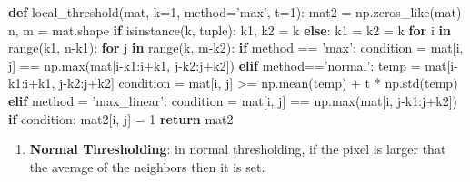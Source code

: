 \documentclass[11pt]{article}
\providecommand{\tightlist}{%
      \setlength{\itemsep}{0pt}\setlength{\parskip}{0pt}}
\newenvironment{Shaded}{}{}
\newcommand{\KeywordTok}[1]{\textcolor[rgb]{0.00,0.44,0.13}{\textbf{{#1}}}}
\newcommand{\DecValTok}[1]{\textcolor[rgb]{0.25,0.63,0.44}{{#1}}}
\newcommand{\StringTok}[1]{\textcolor[rgb]{0.25,0.44,0.63}{{#1}}}
\newcommand{\NormalTok}[1]{{#1}}
\newcommand{\ControlFlowTok}[1]{\textcolor[rgb]{0.00,0.44,0.13}{\textbf{{#1}}}}
\newcommand{\OperatorTok}[1]{\textcolor[rgb]{0.40,0.40,0.40}{{#1}}}
\newcommand{\BuiltInTok}[1]{{#1}}
\begin{document}
\begin{Shaded}
\begin{Highlighting}[]
\KeywordTok{def}\NormalTok{ local_threshold(mat, k}\OperatorTok{=}\DecValTok{1}\NormalTok{, method}\OperatorTok{=}\StringTok{'max'}\NormalTok{, t}\OperatorTok{=}\DecValTok{1}\NormalTok{):}
\NormalTok{    mat2 }\OperatorTok{=}\NormalTok{ np.zeros_like(mat)}
\NormalTok{    n, m }\OperatorTok{=}\NormalTok{ mat.shape}
    \ControlFlowTok{if} \BuiltInTok{isinstance}\NormalTok{(k, }\BuiltInTok{tuple}\NormalTok{):}
\NormalTok{        k1, k2 }\OperatorTok{=}\NormalTok{ k}
    \ControlFlowTok{else}\NormalTok{:}
\NormalTok{        k1 }\OperatorTok{=}\NormalTok{ k2 }\OperatorTok{=}\NormalTok{ k}
    \ControlFlowTok{for}\NormalTok{ i }\KeywordTok{in} \BuiltInTok{range}\NormalTok{(k1, n}\OperatorTok{-}\NormalTok{k1):}
        \ControlFlowTok{for}\NormalTok{ j }\KeywordTok{in} \BuiltInTok{range}\NormalTok{(k, m}\OperatorTok{-}\NormalTok{k2):}
            \ControlFlowTok{if}\NormalTok{ method }\OperatorTok{==} \StringTok{'max'}\NormalTok{:}
\NormalTok{                condition }\OperatorTok{=}\NormalTok{ mat[i, j] }\OperatorTok{==}\NormalTok{ np.}\BuiltInTok{max}\NormalTok{(mat[i}\OperatorTok{-}\NormalTok{k1:i}\OperatorTok{+}\NormalTok{k1, j}\OperatorTok{-}\NormalTok{k2:j}\OperatorTok{+}\NormalTok{k2])}
            \ControlFlowTok{elif}\NormalTok{ method}\OperatorTok{==}\StringTok{'normal'}\NormalTok{:}
\NormalTok{                temp }\OperatorTok{=}\NormalTok{ mat[i}\OperatorTok{-}\NormalTok{k1:i}\OperatorTok{+}\NormalTok{k1, j}\OperatorTok{-}\NormalTok{k2:j}\OperatorTok{+}\NormalTok{k2]}
\NormalTok{                condition }\OperatorTok{=}\NormalTok{ mat[i, j] }\OperatorTok{>=}\NormalTok{ np.mean(temp) }\OperatorTok{+}\NormalTok{ t }\OperatorTok{*}\NormalTok{ np.std(temp)}
            \ControlFlowTok{elif}\NormalTok{ method }\OperatorTok{=} \StringTok{'max_linear'}\NormalTok{:}
\NormalTok{                condition }\OperatorTok{=}\NormalTok{ mat[i, j] }\OperatorTok{==}\NormalTok{ np.}\BuiltInTok{max}\NormalTok{(mat[i, j}\OperatorTok{-}\NormalTok{k1:j}\OperatorTok{+}\NormalTok{k2])}
            \ControlFlowTok{if}\NormalTok{ condition:}
\NormalTok{                mat2[i, j] }\OperatorTok{=} \DecValTok{1}
    \ControlFlowTok{return}\NormalTok{ mat2}
\end{Highlighting}
\end{Shaded}

\begin{enumerate}
\def\labelenumi{\arabic{enumi}.}
\setcounter{enumi}{1}
\tightlist
\item
  \textbf{Normal Thresholding}: in normal thresholding, if the pixel is
  larger that the average of the neighbors then it is set.
\end{enumerate}
\end{document}
